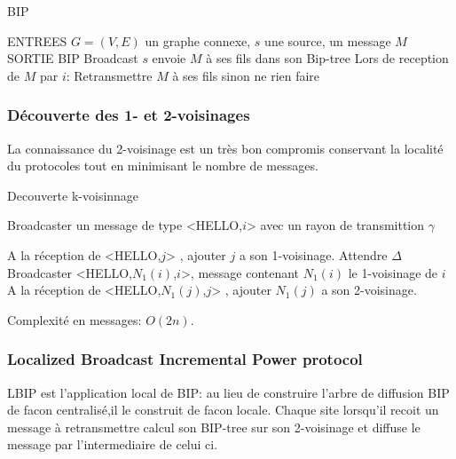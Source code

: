 
\begin{algorithm}[h]
\caption{BIP}
\label{algo_BIP}
\begin{algorithmic}
\STATE ENTREES  $G=(V,E)$ un graphe connexe, $s$ une source, un message $M$
\STATE SORTIE  BIP Broadcast
\STATE $s$ envoie $M$ à ses fils dans son Bip-tree
\STATE Lors de reception de $M$ par $i$:
    \STATE Retransmettre $M$ à ses fils sinon ne rien faire
\ENDIF
\end{algorithmic}
\end{algorithm}



\subsubsection{Découverte des 1- et 2-voisinages}

La connaissance du 2-voisinage est un très bon compromis conservant la localité du protocoles tout en minimisant le nombre de messages.


\begin{algorithm}[h]
\caption{Decouverte k-voisinnage}
\label{algo_k_voisinnage}
\begin{algorithmic}

	\STATE Broadcaster un message de type <HELLO,$i$> avec un rayon de transmittion $\gamma$
\ENDFOR

\STATE A la réception de <HELLO,$j$> , ajouter $j$ a son 1-voisinage.
\STATE Attendre $\Delta$
	\STATE Broadcaster <HELLO,$N_1(i)$,$i$>, message contenant $N_1(i)$ le 1-voisinage de $i$
	\STATE A la réception de <HELLO,$N_1(j)$,$j$> , ajouter $N_1(j)$ a son 2-voisinage.
	
\ENDFOR
\end{algorithmic}
\end{algorithm}

Complexité en messages: $O(2n)$.


\subsubsection{Localized Broadcast Incremental Power protocol \cite{Ingelrest2004}}
LBIP est l'application local de BIP: au lieu de construire l'arbre de diffusion BIP de facon centralisé,il le construit de facon locale.
Chaque site lorsqu'il recoit un message à retransmettre calcul son BIP-tree sur son 2-voisinage et diffuse le message par l'intermediaire de celui ci.

